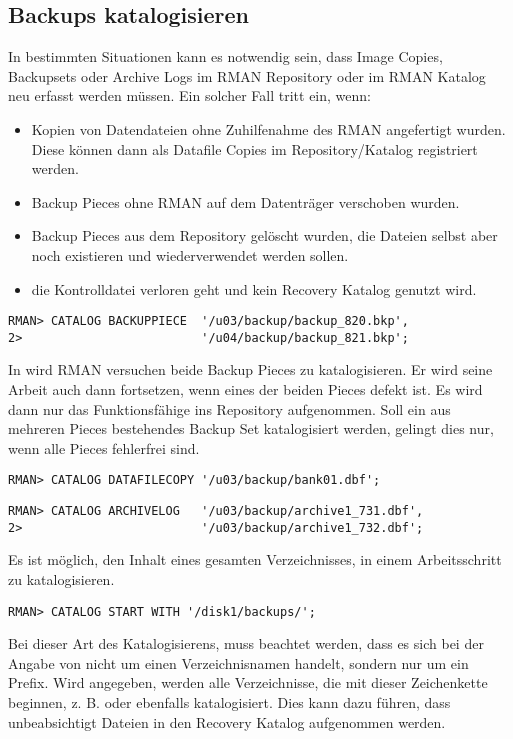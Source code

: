       \subsection{Backups katalogisieren}
        In bestimmten Situationen kann es notwendig sein, dass Image Copies, Backupsets oder Archive Logs im RMAN Repository oder im RMAN Katalog neu erfasst werden m\"ussen. Ein solcher Fall tritt ein, wenn:
        \begin{itemize}
          \item Kopien von Datendateien ohne Zuhilfenahme des RMAN angefertigt wurden. Diese k\"onnen dann als Datafile Copies im Repository/Katalog registriert werden.
          \item Backup Pieces ohne RMAN auf dem Datentr\"ager verschoben wurden.
          \item Backup Pieces aus dem Repository gel\"oscht wurden, die Dateien selbst aber noch existieren und wiederverwendet werden sollen.
          \item die Kontrolldatei verloren geht und kein Recovery Katalog genutzt wird.
          \end{itemize}
        \begin{lstlisting}[caption={Backup Pieces katalogisieren},label=admin1328,language=rman]
RMAN> CATALOG BACKUPPIECE  '/u03/backup/backup_820.bkp',
2>                         '/u04/backup/backup_821.bkp';
        \end{lstlisting}
        In  wird RMAN versuchen beide Backup Pieces zu katalogisieren. Er wird seine Arbeit auch dann fortsetzen, wenn eines der beiden Pieces defekt ist. Es wird dann nur das Funktionsf\"ahige ins Repository aufgenommen. Soll ein aus mehreren Pieces bestehendes Backup Set katalogisiert werden, gelingt dies nur, wenn alle Pieces fehlerfrei sind.
        \begin{lstlisting}[caption={Datendatei-Kopien katalogisieren},label=admin1329,language=rman]
RMAN> CATALOG DATAFILECOPY '/u03/backup/bank01.dbf';
        \end{lstlisting}
        \begin{lstlisting}[caption={Archive Logs katalogisieren},label=admin1330,language=rman]
RMAN> CATALOG ARCHIVELOG   '/u03/backup/archive1_731.dbf',
2>                         '/u03/backup/archive1_732.dbf';
        \end{lstlisting}
        Es ist m\"oglich, den Inhalt eines gesamten Verzeichnisses, in einem Arbeitsschritt zu katalogisieren.
        \begin{lstlisting}[caption={Verzeichnisinhalt katalogisieren},label=admin1331,language=rman]
RMAN> CATALOG START WITH '/disk1/backups/';
        \end{lstlisting}
        Bei dieser Art des Katalogisierens, muss beachtet werden, dass es sich bei der Angabe von  nicht um einen Verzeichnisnamen handelt, sondern nur um ein Prefix. Wird  angegeben, werden alle Verzeichnisse, die mit dieser Zeichenkette beginnen, z. B.  oder  ebenfalls katalogisiert. Dies kann dazu f\"uhren, dass unbeabsichtigt  Dateien in den Recovery Katalog aufgenommen werden.

